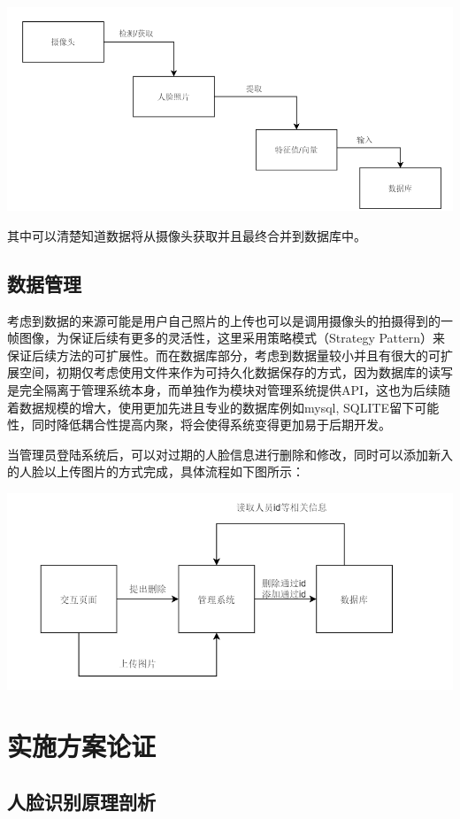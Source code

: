 \documentclass{article}
\begin{document}
\includegraphics[scale=0.3]{imgs/数据获取.png}

其中可以清楚知道数据将从摄像头获取并且最终合并到数据库中。
\subsection{数据管理}
考虑到数据的来源可能是用户自己照片的上传也可以是调用摄像头的拍摄得到的一帧图像，为保证后续有更多的灵活性，这里采用策略模式（Strategy Pattern）来保证后续方法的可扩展性。而在数据库部分，考虑到数据量较小并且有很大的可扩展空间，初期仅考虑使用文件来作为可持久化数据保存的方式，因为数据库的读写是完全隔离于管理系统本身，而单独作为模块对管理系统提供API，这也为后续随着数据规模的增大，使用更加先进且专业的数据库例如mysql, SQLITE留下可能性，同时降低耦合性提高内聚，将会使得系统变得更加易于后期开发。

当管理员登陆系统后，可以对过期的人脸信息进行删除和修改，同时可以添加新入的人脸以上传图片的方式完成，具体流程如下图所示：

\includegraphics[scale=0.4]{imgs/数据管理.png}

\section{实施方案论证}
\subsection{人脸识别原理剖析}
\end{document}
